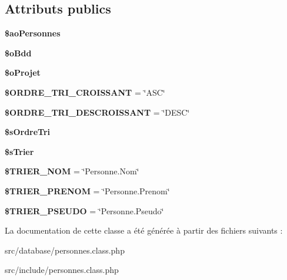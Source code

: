 \subsection*{Attributs publics}
\begin{CompactItemize}
\item 
\textbf{\$aoPersonnes}\label{class_c_personnes_9dcba03dcc26949b85094a23d53e2a9a}

\item 
\textbf{\$oBdd}\label{class_c_personnes_c0fc9b6960b6893f7dd65d947ab33f1e}

\item 
\textbf{\$oProjet}\label{class_c_personnes_383634b498e54a4a24da11edd90f2e9d}

\item 
\textbf{\$ORDRE\_\-TRI\_\-CROISSANT} = \char`\"{}ASC\char`\"{}\label{class_c_personnes_4de0d12d21e2c7f6c131e6134c3aac3c}

\item 
\textbf{\$ORDRE\_\-TRI\_\-DESCROISSANT} = \char`\"{}DESC\char`\"{}\label{class_c_personnes_fd258ffd86c38558176ae3e9c4a99225}

\item 
\textbf{\$sOrdreTri}\label{class_c_personnes_01a7925ec2ad2814660b22a8dbb0faa4}

\item 
\textbf{\$sTrier}\label{class_c_personnes_ffedf6926d4571aeb53daff162e283c7}

\item 
\textbf{\$TRIER\_\-NOM} = \char`\"{}Personne.Nom\char`\"{}\label{class_c_personnes_e4526cae64ef5ca6a6b16ee9b8842de0}

\item 
\textbf{\$TRIER\_\-PRENOM} = \char`\"{}Personne.Prenom\char`\"{}\label{class_c_personnes_6e62de5b454826faea8c06ad8f0a8a4a}

\item 
\textbf{\$TRIER\_\-PSEUDO} = \char`\"{}Personne.Pseudo\char`\"{}\label{class_c_personnes_f0fa16dff468a6fc1b6e39a36483cc2f}

\end{CompactItemize}


La documentation de cette classe a été générée à partir des fichiers suivants :\begin{CompactItemize}
\item 
src/database/personnes.class.php\item 
src/include/personnes.class.php\end{CompactItemize}
